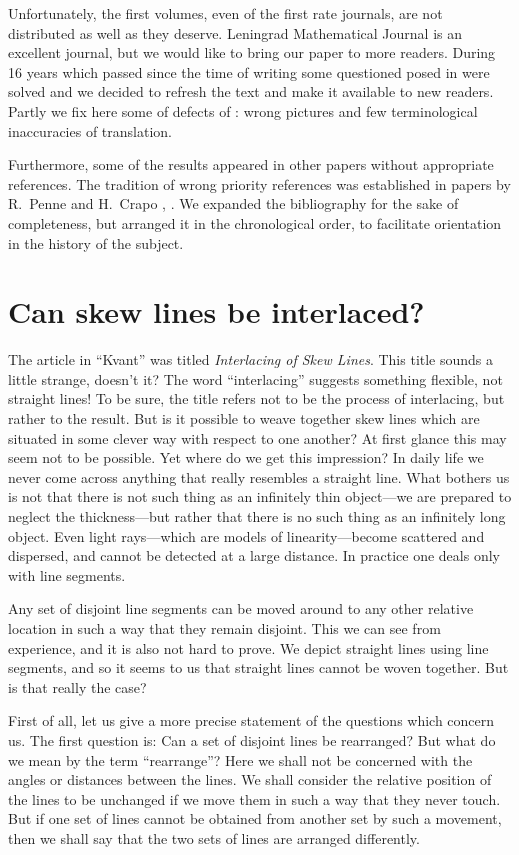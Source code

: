 \documentclass{article}
\begin{document}
Unfortunately, the first volumes, even of the first rate journals, are 
not distributed as well as they deserve. Leningrad Mathematical Journal
is an excellent journal, but we would like to bring our paper to more 
readers. During 16 years which passed since the time of writing \cite{2} some 
questioned posed in \cite{2} were solved and we decided to refresh the 
text and make it available to new readers. Partly we fix here some 
of defects of \cite{2}: wrong pictures and few terminological 
inaccuracies of translation.

Furthermore, some of the results appeared in other papers without appropriate references. The tradition of wrong priority references was established in papers
by R.\ Penne and H.\ Crapo \cite{P1}, \cite{CP}. We expanded the bibliography 
for the sake of completeness, but arranged it in the chronological order, 
to facilitate orientation in the history of the subject.

\section{Can skew lines be interlaced?}
The article in ``Kvant'' was titled {\it Interlacing of Skew Lines\/}. This
title sounds a little strange, doesn't it? The word ``interlacing'' suggests
something flexible, not straight lines! To be sure, the title refers not to be
the process of interlacing, but rather to the result. But is it possible to
weave together skew lines which are situated in some clever way with respect to
one another? At first glance this may seem not to be possible. Yet where do we
get this impression? In daily life we never come across anything that really
resembles a straight line. What bothers us is not that there is not such thing
as an infinitely thin object---we are prepared to neglect the thickness---but
rather that there is no such thing as an infinitely long object. Even light
rays---which are models of linearity---become
 scattered and dispersed, and cannot be detected at a large distance. In
practice one deals only with line segments.


Any set of disjoint line segments can be moved around to any other relative
location in such a way that they remain disjoint. This we can see from
experience, and it is also not hard to prove. We depict straight lines using
line segments, and so it seems to us that straight lines cannot be woven
together. But is that really the case?


First of all, let us give a more precise statement of the questions which
concern us. The first question is: Can a set of disjoint lines be rearranged?
But what do we mean by the term ``rearrange''? Here we shall not be concerned
with the angles or distances between the lines. We shall consider the relative
position of the lines to be unchanged if we move them in such a way that they
never touch. But if one set of lines cannot be obtained from another set by
such a movement, then we shall say that the two sets of lines are arranged
differently.
\end{document}
